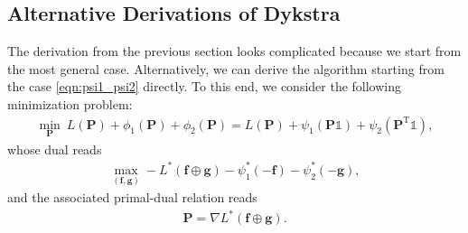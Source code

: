 \documentclass[11pt]{book}
\begin{document}
\subsection{Alternative Derivations of Dykstra}

The derivation from the previous section looks complicated because we start from the most general case. Alternatively, we can derive the algorithm starting from the case \eqref{eqn:psi1_psi2} directly. To this end, we consider the following minimization problem:
\begin{align*}
    \min_{\mathbf{P}} \ L(\mathbf{P}) + \phi_1(\mathbf{P}) + \phi_2(\mathbf{P}) = L(\mathbf{P}) + \psi_1(\mathbf{P}\mathbb{1}) + \psi_2(\mathbf{P}^{\mathrm{T}}\mathbb{1}),
\end{align*}
whose dual reads
\begin{align}\label{eqn:Alternative_Sinkhorn_primal}
    \max_{(\mathbf{f},\mathbf{g})} -L^*(\mathbf{f}\oplus\mathbf{g}) - \psi_1^*(-\mathbf{f}) - \psi_2^*(-\mathbf{g}),
\end{align}
and the associated primal-dual relation reads
\begin{align*}
    \mathbf{P} = \nabla L^*(\mathbf{f}\oplus\mathbf{g}).
\end{align*}
\end{document}
